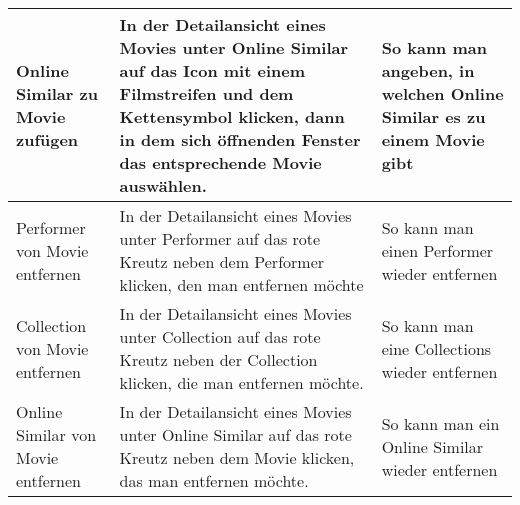 \documentclass[ngerman, landscape]{scrartcl}
\begin{document}
\begin{longtable}{|p{8cm}|p{8cm}|p{8cm}|}
	\hline
	Online Similar zu Movie zufügen & In der Detailansicht eines Movies unter Online Similar auf das Icon mit einem Filmstreifen und dem Kettensymbol klicken, dann in dem sich öffnenden Fenster das entsprechende Movie auswählen. & So kann man angeben, in welchen Online Similar es zu einem Movie gibt \\
	\hline
	Performer von Movie entfernen & In der Detailansicht eines Movies unter Performer auf das rote Kreutz neben dem Performer klicken, den man entfernen möchte & So kann man einen Performer wieder entfernen \\
	\hline
	Collection von Movie entfernen & In der Detailansicht eines Movies unter Collection auf das rote Kreutz neben der Collection klicken, die man entfernen möchte. & So kann man eine Collections wieder entfernen \\
	\hline
	Online Similar von Movie entfernen & In der Detailansicht eines Movies unter Online Similar auf das rote Kreutz neben dem Movie klicken, das man entfernen möchte. & So kann man ein Online Similar wieder entfernen \\
	\hline
\end{longtable}
\end{document}
